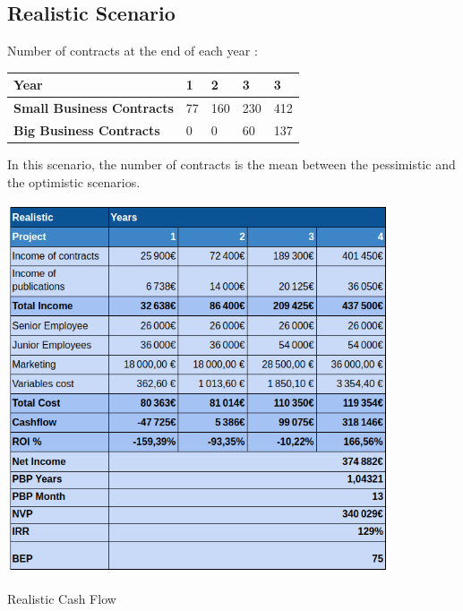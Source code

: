 \documentclass[./main.tex]{subfiles}
\begin{document}
\subsection{Realistic Scenario}
Number of contracts at the end of each year : 
\begin{table}[]
\begin{tabular}{|l|l|l|l|l|}
\hline
\textbf{Year}                     & 1  & 2   & 3   & 3   \\ \hline
\textbf{Small Business Contracts} & 77 & 160 & 230 & 412 \\ \hline
\textbf{Big Business Contracts}   & 0  & 0   & 60  & 137 \\ \hline
\end{tabular}
\end{table}
In this scenario, the number of contracts is the mean between the pessimistic and the optimistic scenarios.
\begin{table}[H]
	\centering
	\includegraphics[width=11.3cm]{realistic.png}
	\caption{Realistic Cash Flow}
	\label{tab:realistic}
\end{table}
\end{document}
